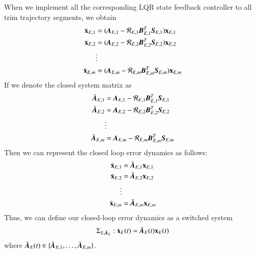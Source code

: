 When we implement all the corresponding LQR state feedback controller to all trim trajectory segments, we obtain
\begin{align}
\dot{\vec{x}}_{E,1} &=(\emph{\textbf{A}}_{E,1}-
\mathcal{R}_{E,1}\emph{\textbf{B}}^{T}_{E,1}
\emph{\textbf{S}}_{E,1})\vec{x}_{E,1} \nonumber \\
\dot{\vec{x}}_{E,2} &=(\emph{\textbf{A}}_{E,2}-
\mathcal{R}_{E,2}\emph{\textbf{B}}^{T}_{E,2}
\emph{\textbf{S}}_{E,2})\vec{x}_{E,2} \nonumber \\
& \vdots \nonumber \\
\dot{\vec{x}}_{E,m} &=(\emph{\textbf{A}}_{E,m}-
\mathcal{R}_{E,m}\emph{\textbf{B}}^{T}_{E,m}
\emph{\textbf{S}}_{E,m})\vec{x}_{E,m}
\end{align}
If we denote the closed system matrix as
\begin{align}
\bar{\emph{\textbf{A}}}_{E,1}&=\emph{\textbf{A}}_{E,1}-
\mathcal{R}_{E,1}\emph{\textbf{B}}^{T}_{E,1}
\emph{\textbf{S}}_{E,1} \nonumber \\
\bar{\emph{\textbf{A}}}_{E,2}&=\emph{\textbf{A}}_{E,2}-
\mathcal{R}_{E,2}\emph{\textbf{B}}^{T}_{E,2}
\emph{\textbf{S}}_{E,2} \nonumber \\
& \vdots \nonumber \\
\bar{\emph{\textbf{A}}}_{E,m}&=\emph{\textbf{A}}_{E,m}-
\mathcal{R}_{E,m}\emph{\textbf{B}}^{T}_{E,m}
\emph{\textbf{S}}_{E,m}
\end{align}
Then we can represent the closed loop error dynamics as
follows:
\begin{align}
\dot{\vec{x}}_{E,1}&=\bar{\emph{\textbf{A}}}_{E,1}\vec{x}_{E,1} \nonumber \\
\dot{\vec{x}}_{E,2}&=\bar{\emph{\textbf{A}}}_{E,2}\vec{x}_{E,2}
 \nonumber 
\\
\vdots \nonumber \\
\dot{\vec{x}}_{E,m}&=\bar{\emph{\textbf{A}}}_{E,m}\vec{x}_{E,m}
\end{align}
Thus, we can define our closed-loop error dynamics as a switched system 
\begin{align}
\Sigma_{S,\bar{\emph{\textbf{A}}}_{E}}: \dot{\vec{x}}_{E}(t)=
\bar{\emph{\textbf{A}}}_{E}(t)\vec{x}_{E}(t)
\end{align}
where $\bar{\emph{\textbf{A}}}_{E}(t)\in\lbrace \bar{\emph{\textbf{A}}}_{E,1},\ldots,\bar{\emph{\textbf{A}}}_{E,m}\rbrace$.


